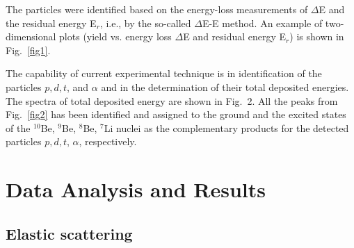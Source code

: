 \documentclass[10pt]{iopart}
\begin{document}
The particles were identified based on the energy-loss measurements of $\Delta$E and the residual energy E$_r$, i.e., by the so-called $\Delta$E-E method. An example of two-dimensional plots (yield vs. energy loss $\Delta$E and residual energy E$_r$) is shown in Fig.~\ref{fig1}.

The capability of current experimental technique is in identification of the particles $p, d, t$, and $\alpha$ and in the determination of their total deposited energies. The spectra of total deposited energy are shown in Fig.~2. All the peaks from Fig.~\ref{fig2} has been identified and assigned to the ground and the excited states of the $^{10}$Be, $^9$Be, $^8$Be, $^7$Li nuclei as the complementary products for the detected particles $p, d, t$, $\alpha$, respectively.

\section{Data Analysis and Results }
\subsection{Elastic scattering}
\end{document}
